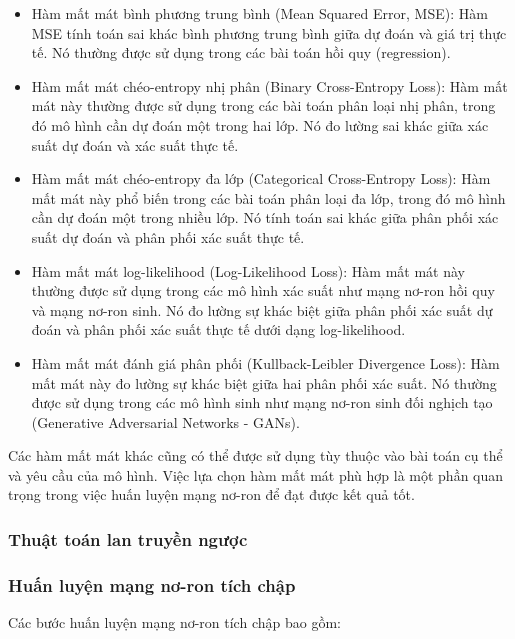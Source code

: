 \begin{itemize}
    \item Hàm mất mát bình phương trung bình (Mean Squared Error, MSE): Hàm MSE tính toán sai khác bình phương trung bình giữa dự đoán và giá trị thực tế. Nó thường được sử dụng trong các bài toán hồi quy (regression).
    \item Hàm mất mát chéo-entropy nhị phân (Binary Cross-Entropy Loss): Hàm mất mát này thường được sử dụng trong các bài toán phân loại nhị phân, trong đó mô hình cần dự đoán một trong hai lớp. Nó đo lường sai khác giữa xác suất dự đoán và xác suất thực tế.
    \item Hàm mất mát chéo-entropy đa lớp (Categorical Cross-Entropy Loss): Hàm mất mát này phổ biến trong các bài toán phân loại đa lớp, trong đó mô hình cần dự đoán một trong nhiều lớp. Nó tính toán sai khác giữa phân phối xác suất dự đoán và phân phối xác suất thực tế.
    \item Hàm mất mát log-likelihood (Log-Likelihood Loss): Hàm mất mát này thường được sử dụng trong các mô hình xác suất như mạng nơ-ron hồi quy và mạng nơ-ron sinh. Nó đo lường sự khác biệt giữa phân phối xác suất dự đoán và phân phối xác suất thực tế dưới dạng log-likelihood.
    \item Hàm mất mát đánh giá phân phối (Kullback-Leibler Divergence Loss): Hàm mất mát này đo lường sự khác biệt giữa hai phân phối xác suất. Nó thường được sử dụng trong các mô hình sinh như mạng nơ-ron sinh đối nghịch tạo (Generative Adversarial Networks - GANs).
\end{itemize}

Các hàm mất mát khác cũng có thể được sử dụng tùy thuộc vào bài toán cụ thể và yêu cầu của mô hình. Việc lựa chọn hàm mất mát phù hợp là một phần quan trọng trong việc huấn luyện mạng nơ-ron để đạt được kết quả tốt.


\subsubsection{Thuật toán lan truyền ngược}
\subsubsection{Huấn luyện mạng nơ-ron tích chập}

Các bước huấn luyện mạng nơ-ron tích chập bao gồm:

